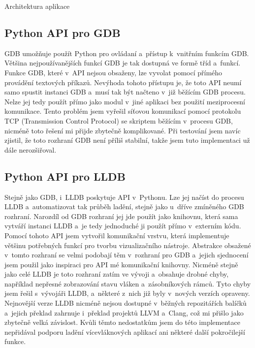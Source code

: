 \documentclass[czech,bachelor,male,python,dept460,hidelinks]{diploma}						%
\begin{document}
\begin{section}{Architektura aplikace}
		\subsection{Python API pro GDB}
		\label{ref:GdbPythonApi}
		GDB umožňuje použít Python pro ovládaní a~přístup k~vnitřním funkcím GDB. \cite{gdb-python-api}
		Většina nejpoužívanějších funkcí GDB je tak dostupná ve formě tříd a~funkcí. Funkce GDB, které v~API nejsou obsaženy, lze vyvolat pomocí
		přímého provádění textových příkazů. Nevýhoda tohoto přístupu je, že toto API neumí samo spustit instanci GDB a~musí tak být načteno v~již běžícím
		GDB procesu. Nelze jej tedy použít přímo jako modul v~jiné aplikaci bez použití meziprocesní komunikace.
		Tento problém jsem vyřešil síťovou komunikací pomocí protokolu TCP (Transmission Control Protocol) se skriptem běžícím v~procesu GDB, nicméně
		toto řešení mi přijde zbytečně komplikované. Při testování jsem navíc zjistil, že toto rozhraní GDB není příliš stabilní, takže jsem tuto implementaci
		už dále nerozšiřoval.
		
		\subsection{Python API pro LLDB}
		Stejně jako GDB, i~LLDB poskytuje API v~Pythonu. Lze jej načíst do procesu LLDB a~automatizovat tak průběh ladění, stejně jako u~dříve zmíněného GDB
		rozhraní. Narozdíl od GDB rozhraní jej jde použít jako knihovnu, která sama vytváří instanci LLDB a~je tedy jednoduché ji použít přímo v~externím kódu.
		Pomocí tohoto API jsem vytvořil komunikační vrstvu, která implementuje většinu potřebných funkcí pro tvorbu vizualizačního nástroje.
		Abstrakce obsažené v~tomto rozhraní se velmi podobají těm v~rozhraní pro GDB a~jejich sjednocení jsem použil jako inspiraci pro API mé komunikační knihovny.
		Nicméně stejně jako celé LLDB je toto rozhraní zatím ve vývoji a~obsahuje drobné chyby, například nepřesné zobrazování stavu vláken a~zásobníkových rámců.
		Tyto chyby jsem řešil s~vývojáři LLDB, a~některé z~nich již byly v~nových verzích opraveny. Nejnovější verze LLDB nicméně nejsou dostupné v~běžných
		repozitářích balíčků a~jejich překlad zahrnuje i~překlad projektů LLVM a~Clang, což mi přišlo jako zbytečně velká závislost.
		Kvůli těmto nedostatkům jsem do této implementace nepřidával podporu ladění vícevláknových aplikací ani některé další pokročilejší funkce.
		

\end{section}
\end{document}
